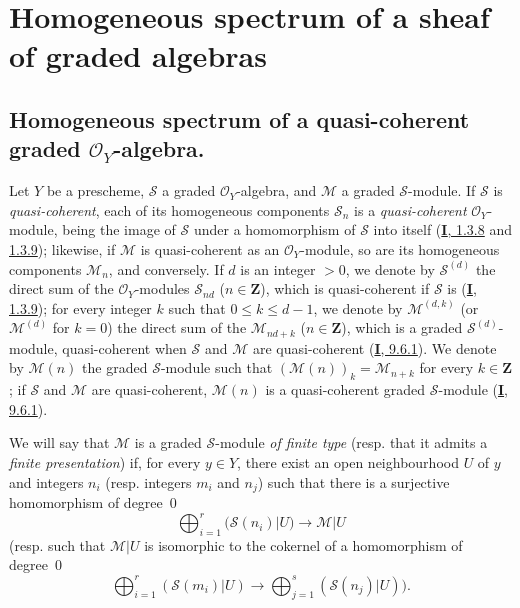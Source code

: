 \section{Homogeneous spectrum of a sheaf of graded algebras}
\label{section:II.3}

\subsection{Homogeneous spectrum of a quasi-coherent graded
$\mathcal{O}_Y$-algebra.}
\label{subsection:II.3.1}
\label{II.3.1}

\begin{env}[3.1.1]
\label{II.3.1.1}
Let $Y$ be a prescheme, $\mathcal{S}$ a graded $\mathcal{O}_Y$-algebra, and
$\mathcal{M}$ a graded $\mathcal{S}$-module. If $\mathcal{S}$ is
\emph{quasi-coherent}, each of its homogeneous components $\mathcal{S}_n$ is
a \emph{quasi-coherent} $\mathcal{O}_Y$-module, being the image of
$\mathcal{S}$ under a homomorphism of $\mathcal{S}$ into itself
(\hyperref[I.1.3.8]{\textbf{I}, 1.3.8} and
\hyperref[I.1.3.9]{1.3.9}); likewise, if $\mathcal{M}$ is
quasi-coherent as an $\mathcal{O}_Y$-module, so are its homogeneous
components $\mathcal{M}_n$, and conversely. If $d$ is an integer $>0$, we
denote by $\mathcal{S}^{(d)}$ the direct sum of the
$\mathcal{O}_Y$-modules $\mathcal{S}_{nd}$ ($n\in\mathbf{Z}$), which is
quasi-coherent if $\mathcal{S}$ is
(\hyperref[I.1.3.9]{\textbf{I}, 1.3.9}); for every integer $k$ such that
$0\leq k\leq d-1$, we denote by $\mathcal{M}^{(d,k)}$ (or
$\mathcal{M}^{(d)}$ for $k=0$) the direct sum of the
$\mathcal{M}_{nd+k}$ ($n\in\mathbf{Z}$), which is a graded
$\mathcal{S}^{(d)}$-module, quasi-coherent when $\mathcal{S}$ and
$\mathcal{M}$ are quasi-coherent (\hyperref[I.9.6.1]{\textbf{I}, 9.6.1}). We
denote by $\mathcal{M}(n)$ the graded $\mathcal{S}$-module such that
$(\mathcal{M}(n))_k=\mathcal{M}_{n+k}$ for every $k\in\mathbf{Z}$; if
$\mathcal{S}$ and $\mathcal{M}$ are quasi-coherent, $\mathcal{M}(n)$ is a
quasi-coherent graded $\mathcal{S}$-module
(\hyperref[I.9.6.1]{\textbf{I}, 9.6.1}).

We will say that $\mathcal{M}$ is a graded $\mathcal{S}$-module
\emph{of finite type} (resp. that it admits a \emph{finite presentation}) if,
for every $y\in Y$, there exist an open neighbourhood $U$ of $y$ and integers
$n_i$ (resp. integers $m_i$ and $n_j$) such that there is a surjective
homomorphism of degree~$0$
\[
  \bigoplus_{i=1}^r(\mathcal{S}(n_i)|U)\longrightarrow\mathcal{M}|U
\]
(resp. such that $\mathcal{M}|U$ is isomorphic to the cokernel of a
homomorphism of degree~$0$
\[
  \bigoplus_{i=1}^r(\mathcal{S}(m_i)|U)
  \longrightarrow\bigoplus_{j=1}^s(\mathcal{S}(n_j)|U)).
\]


\end{env}

